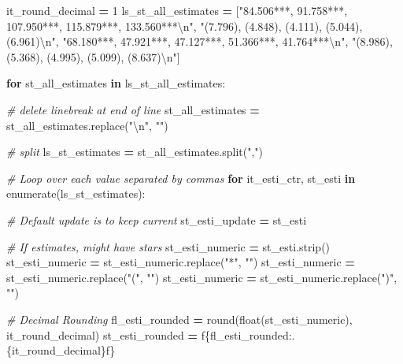 \documentclass[
]{book}
\newenvironment{Shaded}{\begin{snugshade}}{\end{snugshade}}
\newcommand{\BuiltInTok}[1]{#1}
\newcommand{\CharTok}[1]{\textcolor[rgb]{0.31,0.60,0.02}{#1}}
\newcommand{\CommentTok}[1]{\textcolor[rgb]{0.56,0.35,0.01}{\textit{#1}}}
\newcommand{\ControlFlowTok}[1]{\textcolor[rgb]{0.13,0.29,0.53}{\textbf{#1}}}
\newcommand{\DecValTok}[1]{\textcolor[rgb]{0.00,0.00,0.81}{#1}}
\newcommand{\KeywordTok}[1]{\textcolor[rgb]{0.13,0.29,0.53}{\textbf{#1}}}
\newcommand{\NormalTok}[1]{#1}
\newcommand{\OperatorTok}[1]{\textcolor[rgb]{0.81,0.36,0.00}{\textbf{#1}}}
\newcommand{\SpecialCharTok}[1]{\textcolor[rgb]{0.00,0.00,0.00}{#1}}
\newcommand{\SpecialStringTok}[1]{\textcolor[rgb]{0.31,0.60,0.02}{#1}}
\newcommand{\StringTok}[1]{\textcolor[rgb]{0.31,0.60,0.02}{#1}}
\begin{document}
\begin{Shaded}
\begin{Highlighting}[]
\NormalTok{it\_round\_decimal }\OperatorTok{=} \DecValTok{1}
\NormalTok{ls\_st\_all\_estimates }\OperatorTok{=}\NormalTok{ [}\StringTok{"84.506***, 91.758***, 107.950***, 115.879***, 133.560***}\CharTok{\textbackslash{}n}\StringTok{"}\NormalTok{,}
                       \StringTok{"(7.796), (4.848), (4.111), (5.044), (6.961)}\CharTok{\textbackslash{}n}\StringTok{"}\NormalTok{,}
                       \StringTok{"68.180***, 47.921***, 47.127***, 51.366***, 41.764***}\CharTok{\textbackslash{}n}\StringTok{"}\NormalTok{,}
                       \StringTok{"(8.986), (5.368), (4.995), (5.099), (8.637)}\CharTok{\textbackslash{}n}\StringTok{"}\NormalTok{]}

\ControlFlowTok{for}\NormalTok{ st\_all\_estimates }\KeywordTok{in}\NormalTok{ ls\_st\_all\_estimates:}

    \CommentTok{\# delete linebreak at end of line }
\NormalTok{    st\_all\_estimates }\OperatorTok{=}\NormalTok{ st\_all\_estimates.replace(}\StringTok{"}\CharTok{\textbackslash{}n}\StringTok{"}\NormalTok{, }\StringTok{""}\NormalTok{)}
    
    \CommentTok{\# split}
\NormalTok{    ls\_st\_estimates }\OperatorTok{=}\NormalTok{ st\_all\_estimates.split(}\StringTok{","}\NormalTok{)}

    \CommentTok{\# Loop over each value separated by commas}
    \ControlFlowTok{for}\NormalTok{ it\_esti\_ctr, st\_esti }\KeywordTok{in} \BuiltInTok{enumerate}\NormalTok{(ls\_st\_estimates):}
    
        \CommentTok{\# Default update is to keep current}
\NormalTok{        st\_esti\_update }\OperatorTok{=}\NormalTok{ st\_esti}
    
        \CommentTok{\# If estimates, might have stars}
\NormalTok{        st\_esti\_numeric }\OperatorTok{=}\NormalTok{ st\_esti.strip()}
\NormalTok{        st\_esti\_numeric }\OperatorTok{=}\NormalTok{ st\_esti\_numeric.replace(}\StringTok{"*"}\NormalTok{, }\StringTok{""}\NormalTok{)}
\NormalTok{        st\_esti\_numeric }\OperatorTok{=}\NormalTok{ st\_esti\_numeric.replace(}\StringTok{"("}\NormalTok{, }\StringTok{""}\NormalTok{)}
\NormalTok{        st\_esti\_numeric }\OperatorTok{=}\NormalTok{ st\_esti\_numeric.replace(}\StringTok{")"}\NormalTok{, }\StringTok{""}\NormalTok{)}
    
        \CommentTok{\# Decimal Rounding}
\NormalTok{        fl\_esti\_rounded }\OperatorTok{=} \BuiltInTok{round}\NormalTok{(}\BuiltInTok{float}\NormalTok{(st\_esti\_numeric), it\_round\_decimal)}
\NormalTok{        st\_esti\_rounded }\OperatorTok{=} \SpecialStringTok{f\textquotesingle{}}\SpecialCharTok{\{}\NormalTok{fl\_esti\_rounded}\SpecialCharTok{:.}\NormalTok{\{it\_round\_decimal\}}\SpecialCharTok{f\}}\SpecialStringTok{\textquotesingle{}}
        

\end{Highlighting}
\end{Shaded}
\end{document}
